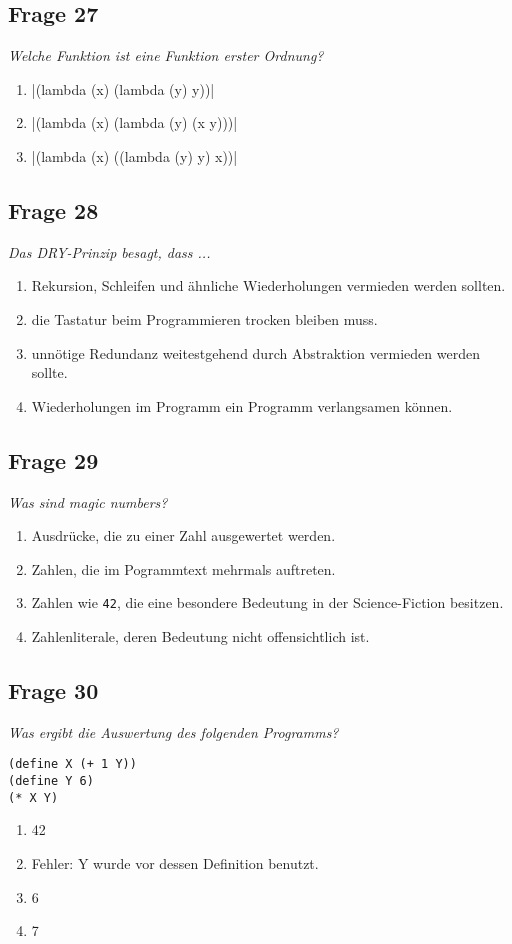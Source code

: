 \documentclass[a4paper, 11pt]{article}
\begin{document}
\subsection*{Frage 27}
\textit{Welche Funktion ist eine Funktion erster Ordnung?}
\begin{enumerate}[label=$\square$]
	\item {}|(lambda (x) (lambda (y) y))|
	\item {}|(lambda (x) (lambda (y) (x y)))|
	\item {}|(lambda (x) ((lambda (y) y) x))|
\end{enumerate}

\subsection*{Frage 28}
\textit{Das DRY-Prinzip besagt, dass ...}
\begin{enumerate}[label=$\square$]
	\item Rekursion, Schleifen und ähnliche Wiederholungen vermieden werden sollten.
	\item die Tastatur beim Programmieren trocken bleiben muss.
	\item unnötige Redundanz weitestgehend durch Abstraktion vermieden werden sollte.
	\item Wiederholungen im Programm ein Programm verlangsamen können.
\end{enumerate}

\subsection*{Frage 29}
\textit{Was sind magic numbers?}
\begin{enumerate}[label=$\square$]
	\item Ausdrücke, die zu einer Zahl ausgewertet werden.
	\item Zahlen, die im Pogrammtext mehrmals auftreten.
	\item Zahlen wie \texttt{42}, die eine besondere Bedeutung in der Science-Fiction besitzen.
	\item Zahlenliterale, deren Bedeutung nicht offensichtlich ist.
\end{enumerate}

\subsection*{Frage 30}
\textit{Was ergibt die Auswertung des folgenden Programms?}
\begin{verbatim}
(define X (+ 1 Y))
(define Y 6)
(* X Y)
\end{verbatim}
\begin{enumerate}[label=$\square$]
	\item 42
	\item Fehler: Y wurde vor dessen Definition benutzt.
	\item 6
	\item 7
\end{enumerate}
\end{document}
